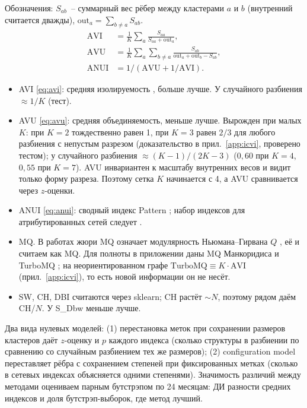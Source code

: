 \documentclass[11pt,a4paper]{article}
\begin{document}
Обозначения: $S_{ab}$~-- суммарный вес рёбер между кластерами $a$ и $b$ (внутренний считается дважды), $\mathrm{out}_a=\sum_{b\ne a}S_{ab}$.
\begin{align}
\mathrm{AVI} &= \frac1K\sum_a \frac{S_{aa}}{S_{aa}+\mathrm{out}_a}, \label{eq:avi}\\
\mathrm{AVU} &= \frac1K\sum_a\sum_{b\ne a}\frac{S_{ab}}{\mathrm{out}_a+\mathrm{out}_b-S_{ab}}, \label{eq:avu}\\
\mathrm{ANUI} &= 1/(\mathrm{AVU}+1/\mathrm{AVI}). \label{eq:anui}
\end{align}
\begin{itemize}
\item AVI \eqref{eq:avi}: средняя изолируемость \cite{biswas}, больше лучше. У случайного разбиения $\approx 1/K$ (тест).
\item AVU \eqref{eq:avu}: средняя объединяемость, меньше лучше. Вырожден при малых $K$: при $K=2$ тождественно равен 1, при $K=3$ равен $2/3$ для любого разбиения с непустым разрезом (доказательство в прил.~\ref{app:icvi}, проверено тестом); у случайного разбиения $\approx (K-1)/(2K-3)$ ($0{,}60$ при $K=4$, $0{,}55$ при $K=7$). AVU инвариантен к масштабу внутренних весов и видит только форму разреза. Поэтому сетка $K$ начинается с 4, а AVU сравнивается через $z$-оценки.
\item ANUI \eqref{eq:anui}: сводный индекс Pattern \cite{biswas,howie}; набор индексов для атрибутированных сетей следует \cite{shalileh-profiling}.
\item MQ. В работах жюри MQ означает модулярность Ньюмана--Гирвана $Q$ \cite{newman}, её и считаем как MQ. Для полноты в приложении даны MQ Манкоридиса \cite{mancoridis} и TurboMQ \cite{mitchell}; на неориентированном графе $\mathrm{TurboMQ}\equiv K\cdot\mathrm{AVI}$ (прил.~\ref{app:icvi}), то есть новой информации он не несёт.
\item SW, CH, DBI считаются через sklearn; CH растёт $\sim N$, поэтому рядом даём CH/$N$. У S\_Dbw меньше лучше.
\end{itemize}

Два вида нулевых моделей: (1) перестановка меток при сохранении размеров кластеров даёт $z$-оценку и $p$ каждого индекса (сколько структуры в разбиении по сравнению со случайным разбиением тех же размеров); (2) configuration model переставляет рёбра с сохранением степеней при фиксированных метках (сколько в сетевых индексах объясняется одними степенями). Значимость различий между методами оцениваем парным бутстрэпом по 24 месяцам: ДИ разности средних индексов и доля бутстрэп-выборок, где метод лучший.
\end{document}

